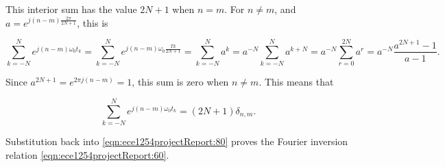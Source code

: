 This interior sum has the value \( 2 N + 1 \) when \( n = m \).
For \( n \ne m \), and
\( a = e^{j (n -m ) \frac{2 \pi}{2 N + 1}} \), this is

\begin{dmath}\label{eqn:ece1254projectReport:100}
\sum_{k = -N}^N
e^{ j (n -m )\omega_0 t_k}
=
\sum_{k = -N}^N
e^{ j (n -m )\omega_0 \frac{T k}{2 N + 1}}
=
\sum_{k = -N}^N a^k
=
a^{-N} \sum_{k = -N}^N a^{k+ N}
=
a^{-N} \sum_{r = 0}^{2 N} a^{r}
=
a^{-N} \frac{a^{2 N + 1} - 1}{a - 1}.
\end{dmath}

Since \( a^{2 N + 1} = e^{2 \pi j (n - m)} = 1 \), this sum is zero when \( n \ne m \).
This means that

\begin{equation}\label{eqn:ece1254projectReport:120}
\sum_{k = -N}^N
e^{ j (n -m )\omega_0 t_k} = (2 N + 1) \delta_{n,m}.
\end{equation}

Substitution back into \cref{eqn:ece1254projectReport:80} proves the Fourier inversion relation \cref{eqn:ece1254projectReport:60}.


